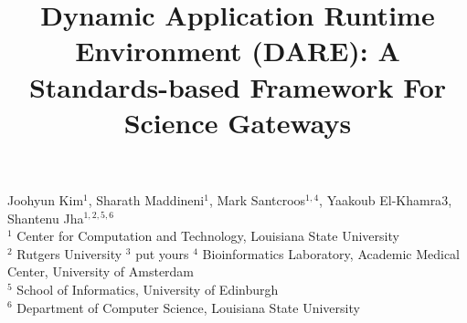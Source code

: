\documentclass[]{article}
\begin{document}
\title{Dynamic Application Runtime Environment (DARE): A
  Standards-based Framework For Science Gateways}

\begin{center}
  Joohyun Kim$^{1}$, Sharath Maddineni$^{1}$, Mark Santcroos$^{1,4}$,
  Yaakoub El-Khamra$3$, Shantenu Jha$^{1,2,5,6}$\\
  $^1$ Center for Computation and Technology, Louisiana State University\\
  $^2$ Rutgers University
  $^3$ put yours
  $^4$ Bioinformatics Laboratory, Academic Medical Center, University of Amsterdam\\
  $^5$ School of Informatics, University of Edinburgh\\

  $^6$ Department of Computer Science, Louisiana State University\\
\end{center}


\end{document}
